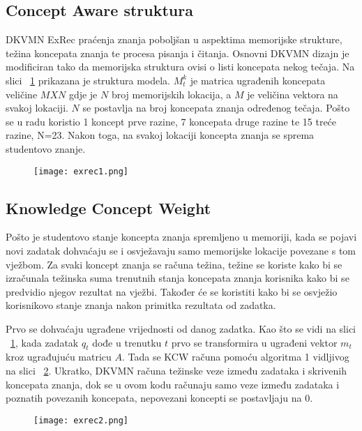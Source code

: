 \subsection{Concept Aware struktura}
DKVMN ExRec praćenja znanja poboljšan u aspektima memorijske strukture, težina koncepata znanja te procesa pisanja i čitanja. Osnovni DKVMN dizajn je modificiran tako da memorijska struktura ovisi o listi koncepata nekog tečaja. Na slici
~\ref{fig:exrec1} prikazana je struktura modela. $M^k_t$ je matrica ugrađenih koncepata veličine $M X N$ gdje je $N$ broj memorijskih lokacija, a $M$ je veličina vektora na svakoj lokaciji. $N$ se postavlja na broj koncepata znanja određenog tečaja. Pošto se u radu koristio 1 koncept prve razine, 7 koncepata druge razine te 15 treće razine, N=23. Nakon toga, na svakoj lokaciji koncepta znanja se sprema studentovo znanje.


	\begin{figure}[!htb]
	\centering
	\texttt{[image: exrec1.png]}
	\caption{}
	\label{fig:exrec1}
\end{figure}


\subsection{Knowledge Concept Weight}

Pošto je studentovo stanje koncepta znanja spremljeno u memoriji, kada se pojavi novi zadatak dohvaćaju se i osvježavaju samo memorijske lokacije povezane s tom vježbom. Za svaki koncept znanja se računa težina, težine se koriste kako bi se izračunala težinska suma trenutnih stanja koncepata znanja korisnika kako bi se predvidio njegov rezultat na vježbi. Također će se koristiti kako bi se osvježio korisnikovo stanje znanja nakon primitka rezultata od zadatka.

Prvo se dohvaćaju ugrađene vrijednosti od danog zadatka. Kao što se vidi na slici ~\ref{fig:exrec1}, kada zadatak $q_t$ dođe u trenutku $t$ prvo se transformira u ugrađeni vektor $m_t$ kroz ugrađujuću matricu $A$. Tada se KCW računa pomoću algoritma 1 vidljivog na slici ~\ref{fig:exrec2}. Ukratko, DKVMN računa težinske veze između zadataka i skrivenih koncepata znanja, dok se u ovom kodu računaju samo veze između zadataka i poznatih povezanih koncepata, nepovezani koncepti se postavljaju na 0.


	\begin{figure}[!htb]
	\centering
	\texttt{[image: exrec2.png]}
	\caption{}
	\label{fig:exrec2}
\end{figure}



